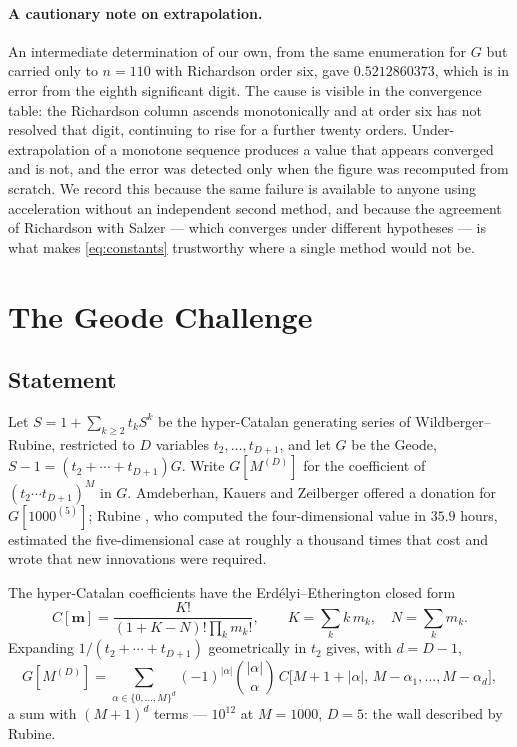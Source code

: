 \documentclass[11pt]{article}
\theoremstyle{definition}
\begin{document}
\paragraph{A cautionary note on extrapolation.} An intermediate determination
of our own, from the same enumeration for $G$ but carried only to $n=110$ with
Richardson order six, gave $0.5212860373$, which is in error from the eighth
significant digit. The cause is visible in the convergence table: the
Richardson column ascends monotonically and at order six has not resolved that
digit, continuing to rise for a further twenty orders. Under-extrapolation of a
monotone sequence produces a value that appears converged and is not, and the
error was detected only when the figure was recomputed from scratch. We record
this because the same failure is available to anyone using acceleration
without an independent second method, and because the agreement of Richardson
with Salzer --- which converges under different hypotheses --- is what makes
\eqref{eq:constants} trustworthy where a single method would not be.

\section{The Geode Challenge}\label{sec:geode}

\subsection{Statement}

Let $S=1+\sum_{k\ge2}t_kS^{k}$ be the hyper-Catalan generating series of
Wildberger--Rubine, restricted to $D$ variables $t_2,\dots,t_{D+1}$, and let
$G$ be the Geode, $S-1=(t_2+\cdots+t_{D+1})G$. Write $G[M^{(D)}]$ for the
coefficient of $(t_2\cdots t_{D+1})^{M}$ in $G$. Amdeberhan, Kauers and
Zeilberger \cite{AKZ} offered a donation for $G[1000^{(5)}]$; Rubine
\cite{Rubine}, who computed the four-dimensional value in $35.9$ hours,
estimated the five-dimensional case at roughly a thousand times that cost and
wrote that new innovations were required.

The hyper-Catalan coefficients have the Erd\'elyi--Etherington closed form
\[
  C[\mathbf m]=\frac{K!}{(1+K-N)!\prod_k m_k!},\qquad
  K=\sum_k k\,m_k,\quad N=\sum_k m_k .
\]
Expanding $1/(t_2+\cdots+t_{D+1})$ geometrically in $t_2$ gives, with $d=D-1$,
\begin{equation}\label{eq:alt}
  G[M^{(D)}]=\sum_{\alpha\in\{0,\dots,M\}^{d}}(-1)^{|\alpha|}
   \binom{|\alpha|}{\alpha}\,
   C\bigl[M{+}1{+}|\alpha|,\,M{-}\alpha_1,\dots,M{-}\alpha_d\bigr],
\end{equation}
a sum with $(M{+}1)^{d}$ terms --- $10^{12}$ at $M=1000$, $D=5$: the wall
described by Rubine.
\end{document}
